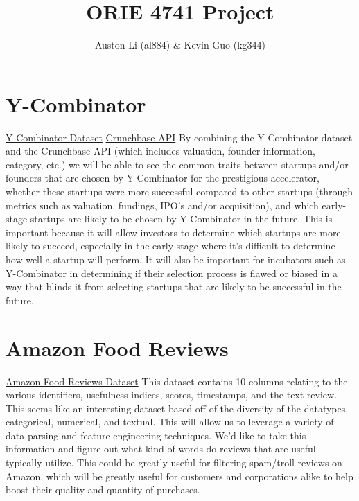 \documentclass[letter]{article}
\title{ORIE 4741 Project}
\author{Auston Li (al884) & Kevin Guo (kg344)}
\begin{document}
\section{Y-Combinator}
\href{https://www.kaggle.com/benhamner/y-combinator-companies/data}{Y-Combinator Dataset}
\newline
\href{https://data.crunchbase.com/v3/docs/using-the-api}{Crunchbase API}
\newline
By combining the Y-Combinator dataset and the Crunchbase API (which includes valuation, founder information, category, etc.) we will be able to see the common traits between startups and/or founders that are chosen by Y-Combinator for the prestigious accelerator, whether these startups were more successful compared to other startups (through metrics such as valuation, fundings, IPO's and/or acquisition), and which early-stage startups are likely to be chosen by Y-Combinator in the future. This is important because it will allow investors to determine which startups are more likely to succeed, especially in the early-stage where it's difficult to determine how well a startup will perform. It will also be important for incubators such as Y-Combinator in determining if their selection process is flawed or biased in a way that blinds it from selecting startups that are likely to be successful in the future.

\section{Amazon Food Reviews}
\href{https://www.kaggle.com/snap/amazon-fine-food-reviews}{Amazon Food Reviews Dataset}
\newline
This dataset contains 10 columns relating to the various identifiers, usefulness indices, scores, timestamps, and the text review. This seems like an interesting dataset based off of the diversity of the datatypes, categorical, numerical, and textual. This will allow us to leverage a variety of data parsing and feature engineering techniques. We'd like to take this information and figure out what kind of words do reviews that are useful typically utilize. This could be greatly useful for filtering spam/troll reviews on Amazon, which will be greatly useful for customers and corporations alike to help boost their quality and quantity of purchases.
\end{document}
